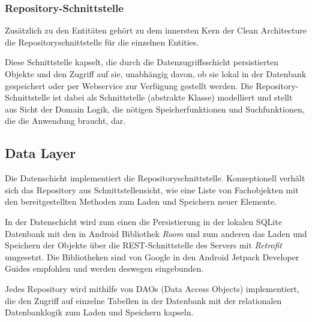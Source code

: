 \subsubsection{Repository-Schnittstelle}
Zusätzlich zu den Entitäten gehört zu dem innersten Kern der Clean Architecture die Repositoryschnittstelle für die einzelnen Entities.

Diese Schnittstelle kapselt, die durch die Datenzugriffsschicht persistierten Objekte und den Zugriff auf sie, unabhängig davon, ob sie lokal in der Datenbank gespeichert oder per Webservice zur Verfügung gestellt werden. 
Die Repository-Schnittstelle ist dabei als Schnittstelle (abstrakte Klasse) modelliert und stellt aus Sicht der Domain Logik, die nötigen Speicherfunktionen und Suchfunktionen, die die Anwendung braucht, dar. 



\subsection{Data Layer} 
Die Datenschicht implementiert die Repositoryschnittstelle. Konzeptionell verhält sich das Repository aus Schnittstellensicht, wie eine Liste von Fachobjekten mit den bereitgestellten Methoden zum Laden und Speichern neuer Elemente.

In der Datenschicht wird zum einen die Persistierung in der lokalen SQLite Datenbank mit den in Android Bibliothek {\em Room} und zum anderen das Laden und Speichern der Objekte über die REST-Schnittstelle des Servers mit {\em Retrofit} umgesetzt. Die Bibliotheken sind von Google in den Android Jetpack Developer Guides empfohlen und werden deswegen eingebunden.

Jedes Repository wird mithilfe von DAOs (Data Access Objects) implementiert, die den Zugriff auf einzelne Tabellen in der Datenbank mit der relationalen Datenbanklogik zum Laden und Speichern kapseln. 


